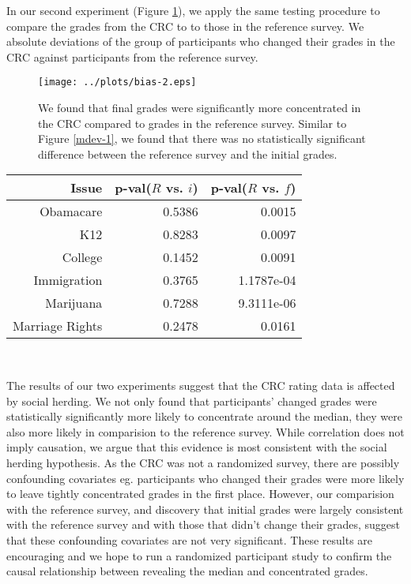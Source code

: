 In our second experiment (Figure \ref{mdev-2}), we apply the same testing procedure to compare the grades from the CRC to to those in the reference survey.
We absolute deviations of the group of participants who changed their grades in the CRC against participants from the reference survey.
\begin{figure}[h]
\hspace{-2.6em}
    \texttt{[image: ../plots/bias-2.eps]}
      \caption{We found that final grades were significantly more concentrated in the CRC compared to grades in the reference survey. Similar to Figure \ref{mdev-1}, we found that there was no statistically significant difference between the reference survey and the initial grades.}
      \label{mdev-2}
\end{figure}

{\centering
\scriptsize
\begin{tabular}[!ht] { r | r | r }
\label{ref-1}
  Issue & p-val($R$ vs. $i$) & p-val($R$ vs. $f$) \\
  \hline
  \hline
  Obamacare &  0.5386 & 0.0015 \\
  \hline
  K12 & 0.8283 & 0.0097 \\
  \hline
  College & 0.1452 & 0.0091 \\
  \hline
  Immigration & 0.3765 & 1.1787e-04\\
  \hline
  Marijuana & 0.7288 & 9.3111e-06\\
  \hline
  Marriage Rights & 0.2478 & 0.0161 \\
\end{tabular}\\[1\baselineskip]
}

The results of our two experiments suggest that the CRC rating data is affected by social herding.
We not only found that participants' changed grades were statistically significantly more likely to concentrate around the median, they were also more likely in comparision to the reference survey.
While correlation does not imply causation, we argue that this evidence is most consistent with the social herding hypothesis.
As the CRC was not a randomized survey, there are possibly confounding covariates eg. participants who changed their grades were more likely to leave tightly concentrated grades in the first place.
However, our comparision with the reference survey, and discovery that initial grades were largely consistent with the reference survey and with those that didn't change their grades, suggest that these confounding covariates are not very significant.
These results are encouraging and we hope to run a randomized participant study to confirm the causal relationship between revealing the median and concentrated grades.

